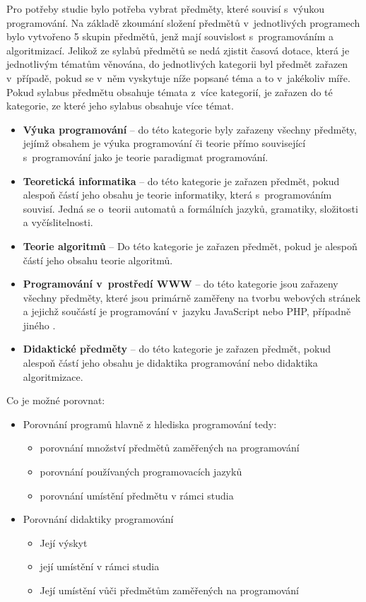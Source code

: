 \documentclass[FP,DP]{tulthesis}
\begin{document}
{{{{{{{Pro potřeby studie bylo potřeba vybrat předměty, které souvisí s~výukou programování. Na základě zkoumání složení předmětů v~jednotlivých programech bylo vytvořeno 5 skupin předmětů, jenž mají souvislost s~programováním a algoritmizací.  Jelikož ze sylabů předmětů se nedá zjistit časová dotace, která je jednotlivým tématům věnována, do jednotlivých kategorii byl předmět zařazen v~případě, pokud se v~něm vyskytuje níže popsané téma a to  v~jakékoliv míře. Pokud sylabus předmětu obsahuje témata z~více kategorií, je zařazen do té kategorie, ze které jeho sylabus obsahuje více témat.
\vspace{2mm}\begin{itemize}[nosep]
  	\item \textbf{Výuka programování} -- do této kategorie byly zařazeny všechny předměty, jejímž obsahem je výuka programování či teorie přímo související s~programování jako je teorie paradigmat programování. 
	\item \textbf{Teoretická informatika} -- do této kategorie je zařazen předmět, pokud alespoň částí jeho obsahu je teorie informatiky, která s~programováním souvisí. Jedná se o~teorii automatů a formálních jazyků, gramatiky, složitosti a vyčíslitelnosti.
	\item\textbf{Teorie algoritmů} -- Do této kategorie je zařazen předmět, pokud je alespoň částí jeho obsahu teorie algoritmů.
	\item \textbf{Programování v~prostředí WWW } -- do této kategorie jsou zařazeny všechny předměty, které jsou primárně  zaměřeny na tvorbu webových stránek a jejichž součástí je programování v~jazyku JavaScript nebo PHP, případně jiného .
\item \textbf{Didaktické předměty } -- do této kategorie je zařazen předmět, pokud alespoň částí jeho obsahu je didaktika programování nebo didaktika algoritmizace.

\end{itemize}

Co je možné porovnat:
\begin{itemize}
\item Porovnání programů hlavně z hlediska programování tedy:
\begin{itemize}
\item porovnání množství předmětů zaměřených na programování
\item porovnání používaných programovacích jazyků
\item porovnání umístění předmětu v rámci studia
\end{itemize}
\item Porovnání didaktiky programování
\begin{itemize}
\item Její výskyt
\item její umístění v rámci studia
\item Její umístění vůči předmětům zaměřených na programování
\end{itemize}



\end{itemize}}}}}}}}
\end{document}
